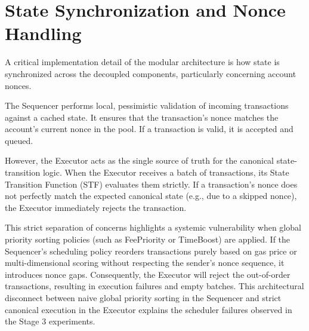 \section{State Synchronization and Nonce Handling}
\label{sec:state_synchronization}

A critical implementation detail of the modular architecture is how state is synchronized across the decoupled components, particularly concerning account nonces.

The Sequencer performs local, pessimistic validation of incoming transactions against a cached state. It ensures that the transaction's nonce matches the account's current nonce in the pool. If a transaction is valid, it is accepted and queued.

However, the Executor acts as the single source of truth for the canonical state-transition logic. When the Executor receives a batch of transactions, its State Transition Function (STF) evaluates them strictly. If a transaction's nonce does not perfectly match the expected canonical state (e.g., due to a skipped nonce), the Executor immediately rejects the transaction. 

This strict separation of concerns highlights a systemic vulnerability when global priority sorting policies (such as FeePriority or TimeBoost) are applied. If the Sequencer's scheduling policy reorders transactions purely based on gas price or multi-dimensional scoring without respecting the sender's nonce sequence, it introduces nonce gaps. Consequently, the Executor will reject the out-of-order transactions, resulting in execution failures and empty batches. This architectural disconnect between naive global priority sorting in the Sequencer and strict canonical execution in the Executor explains the scheduler failures observed in the Stage 3 experiments.